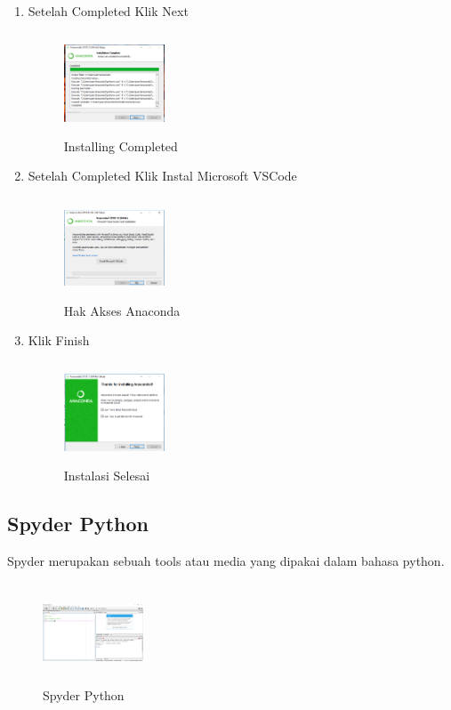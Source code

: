 \begin{enumerate}
    \item Setelah Completed Klik Next
    \begin{figure}[!htbp]
        \centering
        \includegraphics[width=3cm,height=3cm]{figures/gb8.png}
        \caption{Installing Completed}
        \label{Completed}
        \end{figure}

    \item Setelah Completed Klik Instal Microsoft VSCode
    \begin{figure}[!htbp]
        \centering
        \includegraphics[width=3cm,height=3cm]{figures/gb9.png}
        \caption{Hak Akses Anaconda}
        \label{Akses}
        \end{figure}

    \item Klik Finish
    \begin{figure}[!htbp]
        \centering
        \includegraphics[width=3cm,height=3cm]{figures/gb10.png}
        \caption{Instalasi Selesai}
        \label{Selesai}
        \end{figure}
\end{enumerate}
\subsection{Spyder Python}
Spyder merupakan sebuah tools atau media yang dipakai dalam bahasa python.
    \begin{figure}[!htbp]
        \centering
        \includegraphics[width=3cm,height=3cm]{figures/gbrspyder.png}
        \caption{Spyder Python}
        \label{Spyder}
        \end{figure}

